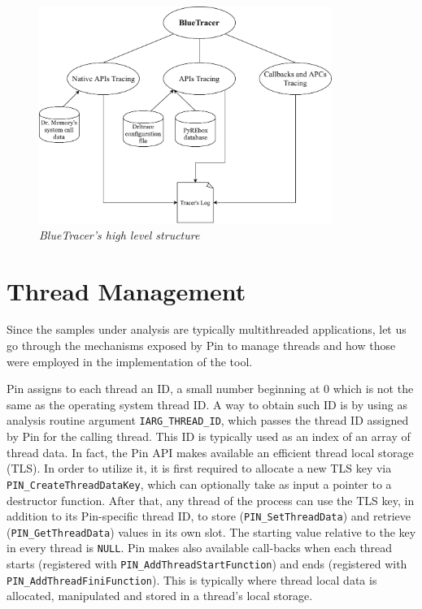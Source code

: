 \begin{figure}[h]
\centering
\includegraphics[width=0.85\textwidth]{Figures/BlueTracer.pdf}
\caption{\textit{BlueTracer's high level structure}}
\end{figure}

\section{Thread Management}

Since the samples under analysis are typically multithreaded applications, let us go through the mechanisms exposed by Pin to manage threads and how those were employed in the implementation of the tool.

Pin assigns to each thread an ID, a small number beginning at 0
which is not the same as the operating system thread ID. A way to obtain such ID is by using as analysis routine argument \texttt{IARG\_THREAD\_ID}, which passes the thread ID assigned by Pin for the calling thread. This ID is typically used as an index of an array of thread data.
In fact, the Pin API makes available an efficient thread local storage (TLS). In order to utilize it, it is first required to allocate a new TLS key via \texttt{PIN\_CreateThreadDataKey}, which can optionally take as input a pointer to a destructor function. After that, any thread of the process can use the TLS key, in addition to its Pin-specific thread ID, to store (\texttt{PIN\_SetThreadData}) and retrieve (\texttt{PIN\_GetThreadData}) values in its own slot. The starting value relative to the key in every thread is \texttt{NULL}.
Pin makes also available call-backs when each thread starts (registered with \texttt{PIN\_AddThreadStartFunction}) and ends (registered with \texttt{PIN\_AddThreadFiniFunction}). This is typically where thread local data is allocated, manipulated and stored in a thread's local storage\cite{Pin}.

